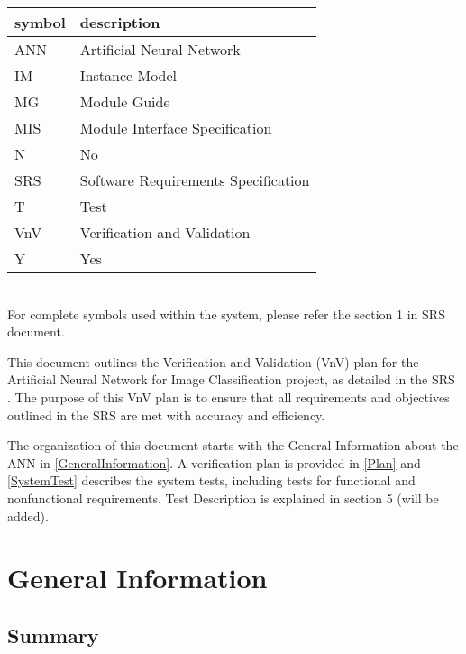 \documentclass[12pt, titlepage]{article}
\begin{document}
\renewcommand{\arraystretch}{1.2}
\begin{tabular}{l l} 
  \toprule		
  \textbf{symbol} & \textbf{description}\\
  \midrule 
  ANN & Artificial Neural Network\\
  IM & Instance Model\\
  MG & Module Guide\\
  MIS & Module Interface Specification\\
  N & No \\
  SRS & Software Requirements Specification\\
  T & Test\\
  VnV & Verification and Validation\\
  Y & Yes\\

  \bottomrule
\end{tabular}\\

For complete symbols used within the system, please refer the section 1 in 
SRS \cite{SRS} document.



\newpage


This document outlines the Verification and Validation (VnV) plan for the Artificial 
Neural Network for Image Classification project, as detailed in the 
SRS \cite{SRS}. 
The purpose of this VnV plan is to ensure that all requirements and objectives outlined 
in the SRS \cite{SRS} 
are met with accuracy and efficiency.

The organization of this document starts with the General Information about the ANN in \autoref{GeneralInformation}. 
A verification plan is provided in \autoref{Plan} and \autoref{SystemTest} 
describes the system tests, including tests for functional and nonfunctional requirements. 
Test Description is explained in section 5 (will be added).

\section{General Information}\label{GeneralInformation}

\subsection{Summary}
\end{document}
